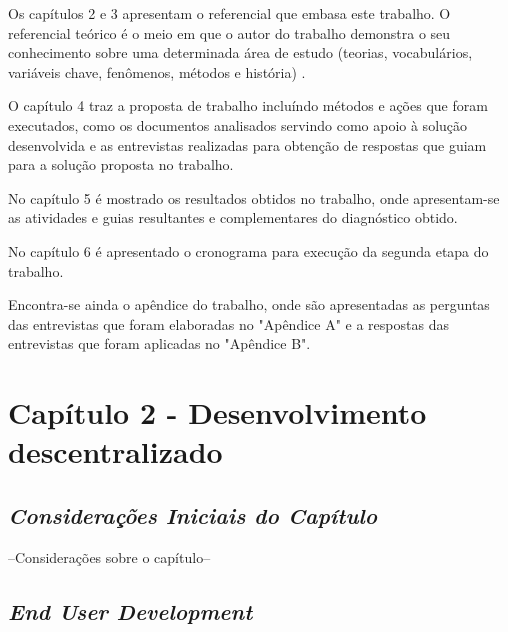 Os capítulos 2 e 3 apresentam o referencial que embasa este trabalho. O referencial teórico é o meio em que o autor do trabalho demonstra o seu conhecimento sobre uma determinada área de estudo (teorias, vocabulários, variáveis chave, fenômenos, métodos e história) \cite{randolph2009}.

O capítulo 4 traz a proposta de trabalho incluíndo métodos e ações que foram executados, como os documentos analisados servindo como apoio à solução desenvolvida e as entrevistas realizadas para obtenção de respostas que guiam para a solução proposta no trabalho.

No capítulo 5 é mostrado os resultados obtidos no trabalho, onde apresentam-se as atividades e guias resultantes e complementares do diagnóstico obtido.

No capítulo 6 é apresentado o cronograma para execução da segunda etapa do trabalho.

Encontra-se ainda o apêndice do trabalho, onde são apresentadas as perguntas das entrevistas que foram elaboradas no "Apêndice A" e a respostas das entrevistas que foram aplicadas no "Apêndice B".

\chapter[Capítulo 2 - Desenvolvimento descentralizado]{Capítulo 2 - Desenvolvimento descentralizado}

\section{\textit{Considerações Iniciais do Capítulo}}

--Considerações sobre o capítulo--

\section{\textit{End User Development}}

